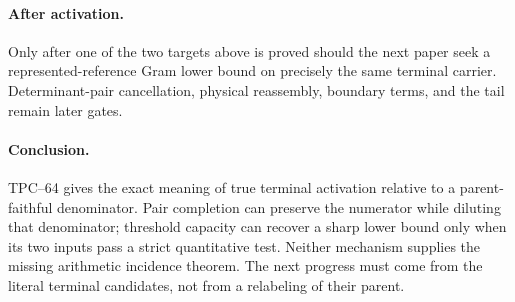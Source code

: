 \paragraph{After activation.}
Only after one of the two targets above is proved should the next paper
seek a represented-reference Gram lower bound on precisely the same
terminal carrier.  Determinant-pair cancellation, physical reassembly,
boundary terms, and the tail remain later gates.

\paragraph{Conclusion.}
TPC--64 gives the exact meaning of true terminal activation relative to a
parent-faithful denominator.  Pair completion can preserve the numerator
while diluting that denominator; threshold capacity can recover a sharp
lower bound only when its two inputs pass a strict quantitative test.
Neither mechanism supplies the missing arithmetic incidence theorem.
The next progress must come from the literal terminal candidates, not
from a relabeling of their parent.
